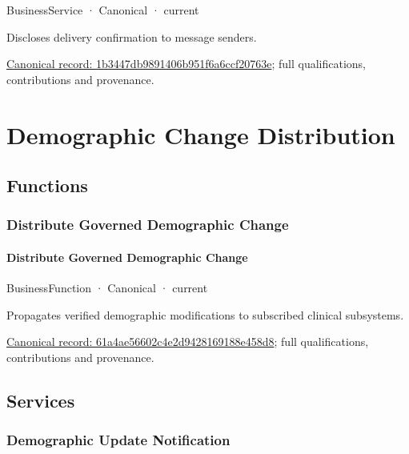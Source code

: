 \label{element:1b3447db9891406b951f6a6ccf20763e}
{\small BusinessService · Canonical · current}\par

Discloses delivery confirmation to message senders.


{\footnotesize \href{../../../../continuum/business/business-service/1b3447db9891406b951f6a6ccf20763e.md}{Canonical record: 1b3447db9891406b951f6a6ccf20763e}; full qualifications, contributions and provenance.}\par
\section{Demographic Change Distribution}

\subsection{Functions}

\subsubsection{Distribute Governed Demographic Change}

\paragraph{Distribute Governed Demographic Change}

\label{element:61a4ae56602c4e2d9428169188e458d8}
{\small BusinessFunction · Canonical · current}\par

Propagates verified demographic modifications to subscribed clinical subsystems.


{\footnotesize \href{../../../../continuum/business/business-function/61a4ae56602c4e2d9428169188e458d8.md}{Canonical record: 61a4ae56602c4e2d9428169188e458d8}; full qualifications, contributions and provenance.}\par
\subsection{Services}

\subsubsection{Demographic Update Notification}

